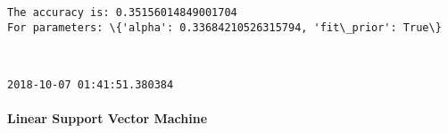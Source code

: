 \documentclass[11pt]{article}
\begin{document}
    \begin{Verbatim}[commandchars=\\\{\}]
The accuracy is: 0.35156014849001704
For parameters: \{'alpha': 0.33684210526315794, 'fit\_prior': True\}

    \end{Verbatim}

    \begin{center}
    \end{center}
    { \hspace*{\fill} \\}
    
    \begin{Verbatim}[commandchars=\\\{\}]
2018-10-07 01:41:51.380384

    \end{Verbatim}

    \paragraph{Linear Support Vector
Machine}\label{linear-support-vector-machine}
\end{document}

